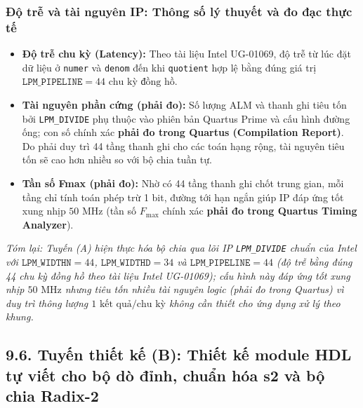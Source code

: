 \subsubsection*{Độ trễ và tài nguyên IP: Thông số lý thuyết và đo đạc thực tế}
\begin{itemize}[leftmargin=1.5em, itemsep=2pt]
    \item \textbf{Độ trễ chu kỳ (Latency):} Theo tài liệu Intel UG-01069, độ trễ từ lúc đặt dữ liệu ở \texttt{numer} và \texttt{denom} đến khi \texttt{quotient} hợp lệ bằng đúng giá trị $\texttt{LPM\_PIPELINE} = 44\text{ chu kỳ đồng hồ}$.
    \item \textbf{Tài nguyên phần cứng (phải đo):} Số lượng ALM và thanh ghi tiêu tốn bởi \texttt{LPM\_DIVIDE} phụ thuộc vào phiên bản Quartus Prime và cấu hình đường ống; con số chính xác \textbf{phải đo trong Quartus (Compilation Report)}. Do phải duy trì 44 tầng thanh ghi cho các toán hạng rộng, tài nguyên tiêu tốn sẽ cao hơn nhiều so với bộ chia tuần tự.
    \item \textbf{Tần số Fmax (phải đo):} Nhờ có 44 tầng thanh ghi chốt trung gian, mỗi tầng chỉ tính toán phép trừ 1 bit, đường tới hạn ngắn giúp IP đáp ứng tốt xung nhịp $50\text{ MHz}$ (tần số $F_{\max}$ chính xác \textbf{phải đo trong Quartus Timing Analyzer}).
\end{itemize}

\textit{Tóm lại: Tuyến (A) hiện thực hóa bộ chia qua lõi IP \texttt{LPM\_DIVIDE} chuẩn của Intel với $\texttt{LPM\_WIDTHN} = 44$, $\texttt{LPM\_WIDTHD} = 34$ và $\texttt{LPM\_PIPELINE} = 44$ (độ trễ bằng đúng 44 chu kỳ đồng hồ theo tài liệu Intel UG-01069); cấu hình này đáp ứng tốt xung nhịp $50\text{ MHz}$ nhưng tiêu tốn nhiều tài nguyên logic (phải đo trong Quartus) vì duy trì thông lượng $1\text{ kết quả/chu kỳ}$ không cần thiết cho ứng dụng xử lý theo khung.}

\subsection*{9.6. Tuyến thiết kế (B): Thiết kế module HDL tự viết cho bộ dò đỉnh, chuẩn hóa s2 và bộ chia Radix-2}

